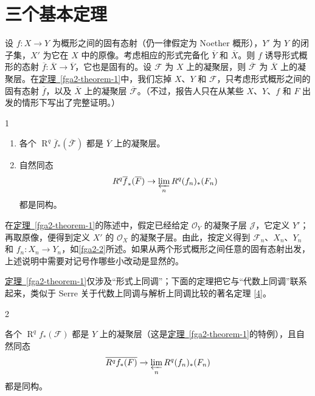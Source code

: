 \chapter{三个基本定理}\thispagestyle{fancy}\label{fga2-3}
\par{}设 \(f\colon  X\to  Y\) 为概形之间的固有态射（仍一律假定为 Noether 概形），\(Y'\) 为 \(Y\) 的闭子集，\(X'\) 为它在 \(X\) 中的原像。考虑相应的形式完备化 \(\overline {Y}\) 和 \(\overline {X}\)。则 \(f\) 诱导形式概形的态射 \(\overline {f}\colon \overline {X}\to \overline {Y}\)，它也是固有的。设 \(\mathscr {F}\) 为 \(X\) 上的凝聚层，则 \(\overline {\mathscr {F}}\) 为 \(\overline {X}\) 上的凝聚层。在\hyperref[fga2-theorem-1]{定理~\ref*{fga2-theorem-1}}中，我们忘掉 \(X\)、\(Y\) 和 \(\mathscr {F}\)，只考虑形式概形之间的固有态射 \(\overline {f}\)，以及 \(\overline {X}\) 上的凝聚层 \(\overline {\mathscr {F}}\)。（不过，报告人只在从某些 \(X\)、\(Y\)、\(f\) 和 \(F\) 出发的情形下写出了完整证明。）
\begin{theorem}[{有限性定理}]{1}\label{fga2-theorem-1}\skipsinglepar
\begin{enumerate}
    
 \item[i.]各个 \(\operatorname {R}^q\overline {f}_*(\overline {\mathscr {F}})\) 都是 \(\overline {Y}\) 上的凝聚层。


    
 \item[ii.]自然同态 \[         \operatorname {R}^q\overline {f}_*(\overline {\mathscr {F}})         \to  \varprojlim _n\operatorname {R}^q (f_n)_*(\mathscr {F}_n)       \] 都是同构。

  \end{enumerate}\end{theorem}
\par{}在\hyperref[fga2-theorem-1]{定理~\ref*{fga2-theorem-1}}的陈述中，假定已经给定 \(\mathcal {O}_Y\) 的凝聚子层 \(\mathscr {J}\)，它定义 \(Y'\)；再取原像，便得到定义 \(X'\) 的 \(\mathcal {O}_X\) 的凝聚子层。由此，按定义得到 \(\mathscr {F}_n\)、\(X_n\)、\(Y_n\) 和 \(f_n\colon  X_n\to  Y_n\)，如\cref{fga2-2}所述。如果从两个形式概形之间任意的固有态射出发，上述说明中需要对记号作哪些小改动是显然的。
\par{}\hyperref[fga2-theorem-1]{定理~\ref*{fga2-theorem-1}}仅涉及“形式上同调”；下面的定理把它与“代数上同调”联系起来，类似于 Serre 关于代数上同调与解析上同调比较的著名定理 \hyperref[Ser1956]{[4]}。
\begin{theorem}[{第一比较定理}]{2}\label{fga2-theorem-2}\skipsinglepar
\par{}各个 \(\operatorname {R}^q f_*(\mathscr {F})\) 都是 \(Y\) 上的凝聚层（这是\hyperref[fga2-theorem-1]{定理~\ref*{fga2-theorem-1}}的特例），且自然同态 \[       \overline {\operatorname {R}^q f_*(\mathscr {F})}       \to  \varprojlim _n \operatorname {R}^q (f_n)_*(\mathscr {F}_n)     \] 都是同构。\end{theorem}
